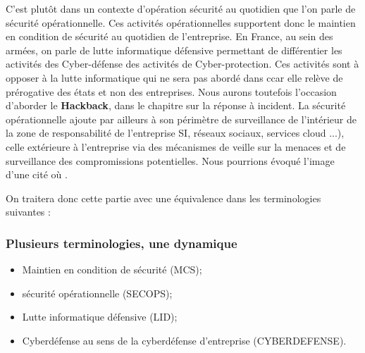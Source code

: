 C’est plutôt dans un contexte d'opération sécurité au quotidien que l’on parle de sécurité opérationnelle. Ces activités opérationnelles supportent donc le maintien en condition de sécurité au quotidien de l’entreprise. En France, au sein des armées, on parle de lutte informatique défensive permettant de différentier les activités des Cyber-défense des activités de Cyber-protection. Ces activités sont à opposer à la lutte informatique qui ne sera pas abordé dans c\ecours car elle relève de prérogative des états et non des entreprises. Nous aurons toutefois l'occasion d'aborder le \textbf{Hackback}, dans le chapitre sur la réponse à incident.
La sécurité opérationnelle ajoute par ailleurs à son périmètre de surveillance de l'intérieur de la zone de responsabilité de l'entreprise SI, réseaux sociaux, services cloud ...), celle extérieure à l'entreprise via des mécanismes de veille sur la menaces et de surveillance des compromissions potentielles. Nous pourrions évoqué l'image d'une cité où .

On traitera donc cette partie avec une équivalence dans les terminologies suivantes :

\begin{frame}
\frametitle<presentation>{Plusieurs terminologies, une dynamique}
	\begin{itemize}
		\item Maintien en condition de sécurité (MCS);
		\item sécurité opérationnelle (SECOPS);
		\item Lutte informatique défensive (LID);
		\item Cyberdéfense au sens de la cyberdéfense d'entreprise (CYBERDEFENSE).
	\end{itemize}
\end{frame}

